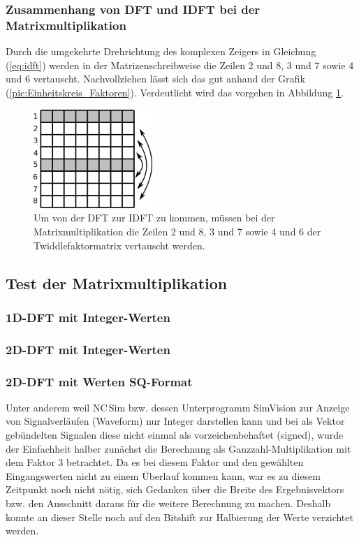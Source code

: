 \subsubsection{Zusammenhang von DFT und IDFT bei der Matrixmultiplikation}

Durch die umgekehrte Drehrichtung des komplexen Zeigers in Gleichung (\ref{eq:idft}) werden in der Matrizenschreibweise die Zeilen 2 und 8, 3 und 7 sowie 4 und 6 vertauscht.
Nachvollziehen lässt sich das gut anhand der Grafik (\ref{pic:Einheitskreis_Faktoren}). 
Verdeutlicht wird das vorgehen in Abbildung \ref{pic:IDFT_Zeilentausch}.

\begin{figure}[ht]
 \centering
 \includegraphics[width=0.4\textwidth]{img/IDFT_Zeilentausch.png}
 \caption{Um von der DFT zur IDFT zu kommen, müssen bei der Matrixmultiplikation die Zeilen 2 und 8, 3 und 7 sowie 4 und 6 der Twiddlefaktormatrix vertauscht werden.}
 \label{pic:IDFT_Zeilentausch}
\end{figure}



\subsection{Test der Matrixmultiplikation}


\subsubsection{1D-DFT mit Integer-Werten}
 
\subsubsection{2D-DFT mit Integer-Werten}

\subsubsection{2D-DFT mit Werten SQ-Format}

Unter anderem weil NC\,Sim bzw. dessen Unterprogramm SimVision zur Anzeige von Signalverläufen (Waveform) nur Integer darstellen kann und bei als Vektor gebündelten Signalen 
diese nicht einmal als vorzeichenbehaftet (signed), wurde der Einfachheit halber zunächst die Berechnung als Ganzzahl-Multiplikation mit dem Faktor 3 betrachtet. 
Da es bei diesem Faktor und den gewählten Eingangswerten nicht zu einem 
Überlauf kommen kann, war es zu diesem Zeitpunkt noch nicht nötig, sich Gedanken über die Breite des Ergebnisvektors bzw. den Ausschnitt daraus für die weitere
Berechnung zu machen. Deshalb konnte an dieser Stelle noch auf den Bitshift zur Halbierung der Werte verzichtet werden.

